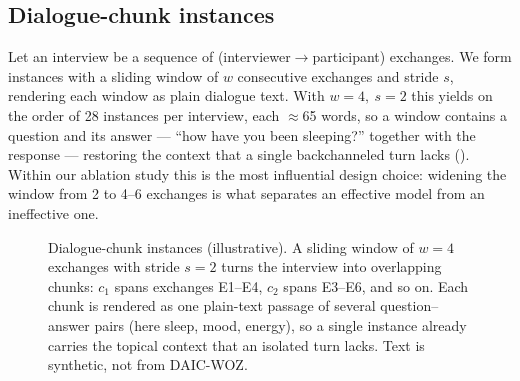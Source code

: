 \documentclass[conference]{IEEEtran}
\begin{document}
\subsection{Dialogue-chunk instances}
Let an interview be a sequence of (interviewer$\rightarrow$participant)
exchanges. We form instances with a sliding window of $w$ consecutive
exchanges and stride $s$, rendering each window as plain dialogue text. With
$w=4,\ s=2$ this yields on the order of 28 instances per interview, each
$\approx$65 words, so a window contains a question and its answer ---
``how have you been sleeping?'' together with the response --- restoring the
context that a single backchanneled turn lacks (). Within our
ablation study this is the most influential design choice:
widening the window from 2 to 4--6 exchanges is what separates an effective model
from an ineffective one.

\begin{figure}[t]
\centering
{}
\caption{Dialogue-chunk instances (illustrative). A sliding window of $w{=}4$
exchanges with stride $s{=}2$ turns the interview into overlapping chunks: $c_1$
spans exchanges E1--E4, $c_2$ spans E3--E6, and so on. Each chunk is rendered as
one plain-text passage of several question--answer pairs (here sleep, mood,
energy), so a single instance already carries the topical context that an
isolated turn lacks. Text is synthetic, not from DAIC-WOZ.}
\label{fig:chunk}
\end{figure}
\end{document}
